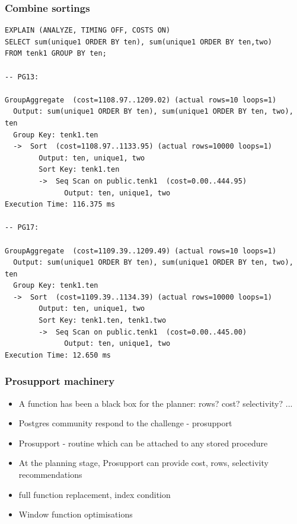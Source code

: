 \documentclass{beamer}
\begin{document}
\begin{frame}[fragile]\frametitle{Combine sortings}
\begin{lstlisting}[basicstyle=\tiny]
EXPLAIN (ANALYZE, TIMING OFF, COSTS ON)
SELECT sum(unique1 ORDER BY ten), sum(unique1 ORDER BY ten,two)
FROM tenk1 GROUP BY ten;

-- PG13:

GroupAggregate  (cost=1108.97..1209.02) (actual rows=10 loops=1)
  Output: sum(unique1 ORDER BY ten), sum(unique1 ORDER BY ten, two), ten
  Group Key: tenk1.ten
  ->  Sort  (cost=1108.97..1133.95) (actual rows=10000 loops=1)
        Output: ten, unique1, two
        Sort Key: tenk1.ten
        ->  Seq Scan on public.tenk1  (cost=0.00..444.95)
              Output: ten, unique1, two
Execution Time: 116.375 ms

-- PG17:

GroupAggregate  (cost=1109.39..1209.49) (actual rows=10 loops=1)
  Output: sum(unique1 ORDER BY ten), sum(unique1 ORDER BY ten, two), ten
  Group Key: tenk1.ten
  ->  Sort  (cost=1109.39..1134.39) (actual rows=10000 loops=1)
        Output: ten, unique1, two
        Sort Key: tenk1.ten, tenk1.two
        ->  Seq Scan on public.tenk1  (cost=0.00..445.00)
              Output: ten, unique1, two
Execution Time: 12.650 ms
\end{lstlisting}
\end{frame}

\begin{frame}[fragile]\frametitle{Prosupport machinery}
\begin{itemize}
  \item A function has been a black box for the planner: rows? cost? selectivity? ...
  \item Postgres community respond to the challenge - prosupport
  \item Prosupport - routine which can be attached to any stored procedure
  \item At the planning stage, Prosupport can provide cost, rows, selectivity recommendations
  \item full function replacement, index condition
  \item Window function optimisations
\end{itemize}
\end{frame}
\end{document}
